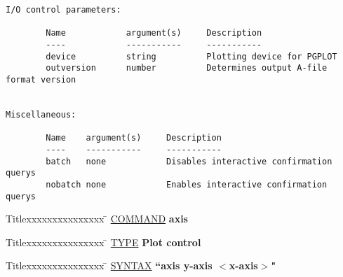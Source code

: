 \begin{list}{}{\setlength{\leftmargin}{0.5in}
     \setlength{\rightmargin}{0in}}
\begin{verbatim}
I/O control parameters:

        Name            argument(s)     Description
        ----            -----------     -----------
        device          string          Plotting device for PGPLOT
        outversion      number          Determines output A-file format version


Miscellaneous:

        Name    argument(s)     Description
        ----    -----------     -----------
        batch   none            Disables interactive confirmation querys
        nobatch none            Enables interactive confirmation querys
\end{verbatim}
\end{list}
\vspace{.2in}

\begin{tabbing}
Titlexxxxxxxxxxxxxxx \= \kill
\underline{COMMAND} \> {\bf    axis} \\
\end{tabbing}

\begin{tabbing}
Titlexxxxxxxxxxxxxxx \= \kill
\underline{TYPE} \> {\bf            Plot control} \\
\end{tabbing}

\begin{tabbing}
Titlexxxxxxxxxxxxxxx \= \kill
\underline{SYNTAX} \> {\bf          ``axis y-axis $<$x-axis$>$"} \\
\end{tabbing}

